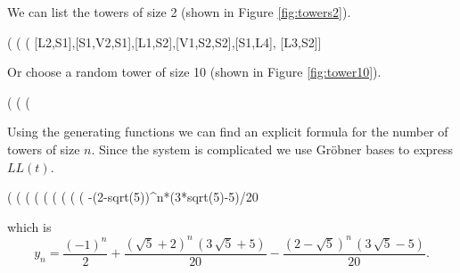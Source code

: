 \documentclass[10pt]{article}
\begin{document}
%
We can list the towers of size 2 (shown in Figure \ref{fig:towers2}).

\begin{example}
(%
(%
(%
       [L2,S1],[S1,V2,S1],[L1,S2],[V1,S2,S2],[S1,L4],
       [L3,S2]]
\end{example}
%
Or choose a random tower of size 10 (shown in Figure \ref{fig:tower10}).
\begin{example}
(%
(%
(%
\end{example}
%
Using the generating functions we can find an explicit formula for
the number of towers of size $n$. Since the system is complicated
we use Gr\"obner bases to express $LL(t)$.

\begin{example}
(%
(%
(%
(%
(%
(%
(%
(%
(%
                      -(2-sqrt(5))^n*(3*sqrt(5)-5)/20
\end{example}
which is
$$
{y}_{n}=\frac{{\left( -1\right) }^{n}}{2}+\frac{{\left( \sqrt{5}+2\right) }^{n}\,\left( 3\,\sqrt{5}+5\right) }{20}-\frac{{\left( 2-\sqrt{5}\right) }^{n}\,\left( 3\,\sqrt{5}-5\right) }{20}.
$$
\end{document}
